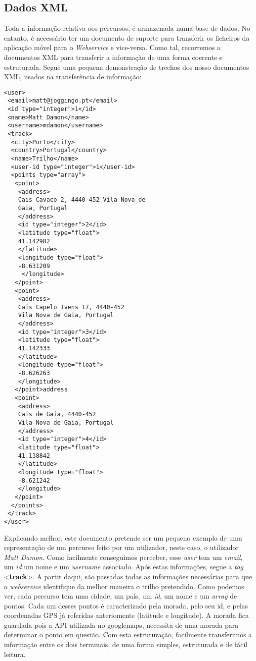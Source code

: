 \documentclass[twocolumn,twoside,10pt,a4paper]{article}
\begin{document}
\subsection {Dados XML}
Toda a informação relativa aos percursos, é armazenada numa base de dados. No entanto, é necessário ter um documento de suporte para transferir os ficheiros da aplicação móvel para o \textit{Webservice} e vice-versa. Como tal, recorremos a documentos XML para transferir a informação de uma forma coerente e estruturada. Segue uma pequena demonstração de trechos dos nosso documentos XML, usados na transferência de informação:

\begin{lstlisting}
<user>
 <email>matt@joggingo.pt</email>
 <id type="integer">1</id>
 <name>Matt Damon</name>
 <username>mdamon</username>
 <track>
  <city>Porto</city>
  <country>Portugal</country>
  <name>Trilho</name>
  <user-id type="integer">1</user-id>
  <points type="array">
   <point>
    <address>
    Cais Cavaco 2, 4440-452 Vila Nova de 
    Gaia, Portugal
    </address>
    <id type="integer">2</id>
    <latitude type="float">
    41.142982
    </latitude>
    <longitude type="float">
    -8.631209
     </longitude>
   </point>
   <point>
    <address>
    Cais Capelo Ivens 17, 4440-452 
    Vila Nova de Gaia, Portugal
    </address>
    <id type="integer">3</id>
    <latitude type="float">
    41.142333
    </latitude>
    <longitude type="float">
    -8.626263
    </longitude>
   </point>address
   <point>
    <address>
    Cais de Gaia, 4440-452 
    Vila Nova de Gaia, Portugal
    </address>
    <id type="integer">4</id>
    <latitude type="float">
    41.138842
    </latitude>
    <longitude type="float">
    -8.621242
    </longitude>
   </point>
  </points>
 </track>
</user>
\end{lstlisting}

Explicando melhor, este documento pretende ser um pequeno exemplo de uma representação de um percurso feito por um utilizador, neste caso, o utilizador \textit{Matt Damon}. Como facilmente conseguimos perceber, esse \textit{user} tem um \textit{email}, um \textit{id} um nome e um \textit{username} associado. Após estas informações, segue a \textit{tag} <\textbf{track}>. A partir daqui, são passadas todas as informações necessárias para que o \textit{webservice} identifique da melhor maneira o trilho pretendido. Como podemos ver, cada percurso tem uma cidade, um país, um \textit{id}, um nome e um \textit{array} de pontos. Cada um desses pontos é caracterizado pela morada, pelo seu id, e pelas coordenadas GPS já referidas anteriomente (latitude e longitude). A morada fica guardada pois a API utilizada no googlemaps, necessita de uma morada para determinar o ponto em questão. Com esta estruturação, facilmente transferimos a informação entre os dois terminais, de uma forma simples, estruturada e de fácil leitura.
\end{document}
